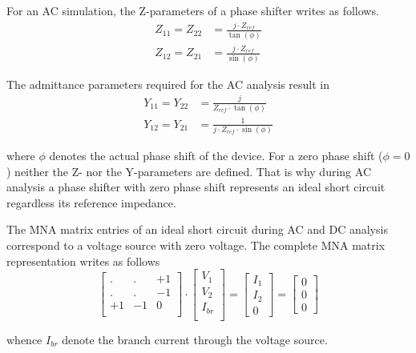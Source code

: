 \addvspace{12pt}

For an AC simulation, the Z-parameters of a phase shifter writes
as follows.
\begin{align}
Z_{11} = Z_{22} &= \frac{j\cdot Z_{ref}}{\tan(\phi)}\\
Z_{12} = Z_{21} &= \frac{j\cdot Z_{ref}}{\sin(\phi)}
\end{align}

The admittance parameters required for the AC analysis result in
\begin{align}
Y_{11} = Y_{22} &= \frac{j}{Z_{ref} \cdot \tan{\left(\phi\right)}}\\
Y_{12} = Y_{21} &= \frac{1}{j\cdot Z_{ref}\cdot \sin{\left(\phi\right)}}
\end{align}

where $\phi$ denotes the actual phase shift of the device.  For a zero
phase shift ($\phi = 0$) neither the Z- nor the Y-parameters are
defined.  That is why during AC analysis a phase shifter with zero
phase shift represents an ideal short circuit regardless its reference
impedance.

\addvspace{12pt}

The MNA matrix entries of an ideal short circuit during AC and DC
analysis correspond to a voltage source with zero voltage.  The
complete MNA matrix representation writes as follows
\begin{equation}
\begin{bmatrix}
. & . & +1\\
. & . & -1\\
+1 & -1 & 0\\
\end{bmatrix}
\cdot
\begin{bmatrix}
V_1\\
V_2\\
I_{br}\\
\end{bmatrix}
=
\begin{bmatrix}
I_1\\
I_2\\
0
\end{bmatrix}
=
\begin{bmatrix}
0\\
0\\
0
\end{bmatrix}
\end{equation}

whence $I_{br}$ denote the branch current through the voltage source.

\addvspace{12pt}


